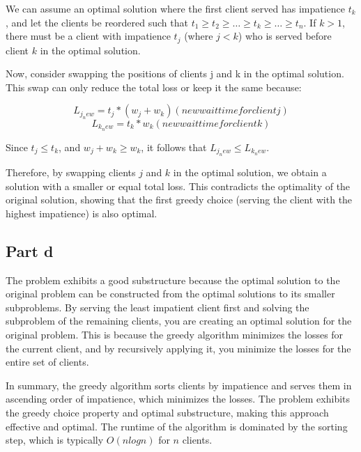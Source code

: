 We can assume an optimal solution where the first client served has impatience $t_k$, and let the clients be reordered such that $t_1 \geq  t_2 \geq  \dots \geq  t_k \geq  \dots \geq  t_n$. If $k > 1$, there must be a client with impatience $t_j$ (where $j < k$) who is served before client $k$ in the optimal solution.

Now, consider swapping the positions of clients j and k in the optimal solution. This swap can only reduce the total loss or keep it the same because:

\[L_{j_new} = t_j * (w_j + w_k) (new wait time for client j)\]
\[L_{k_new} = t_k * w_k (new wait time for client k)\]

Since $t_j \leq  t_k$, and $w_j + w_k \geq  w_k$, it follows that $L_{j_new} \leq  L_{k_new}$.

Therefore, by swapping clients $j$ and $k$ in the optimal solution, we obtain a solution with a smaller or equal total loss. This contradicts the optimality of the original solution, showing that the first greedy choice (serving the client with the highest impatience) is also optimal.



\subsection*{Part d}
The problem exhibits a good substructure because the optimal solution to the original problem can be constructed from the optimal solutions to its smaller subproblems. By serving the least impatient client first and solving the subproblem of the remaining clients, you are creating an optimal solution for the original problem. This is because the greedy algorithm minimizes the losses for the current client, and by recursively applying it, you minimize the losses for the entire set of clients.

In summary, the greedy algorithm sorts clients by impatience and serves them in ascending order of impatience, which minimizes the losses. The problem exhibits the greedy choice property and optimal substructure, making this approach effective and optimal. The runtime of the algorithm is dominated by the sorting step, which is typically $O(n log n)$ for $n$ clients.





